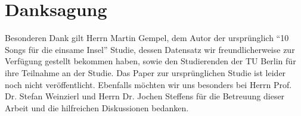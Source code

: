 \section*{Danksagung}
\label{sec:Danksagung}
Besonderen Dank gilt Herrn Martin Gempel, dem Autor der ursprünglich "`10 Songs für die einsame Insel"' Studie, dessen Datensatz wir freundlicherweise zur Verfügung gestellt bekommen haben, sowie den Studierenden der TU Berlin für ihre Teilnahme an der Studie.
Das Paper zur ursprünglichen Studie ist leider noch nicht veröffentlicht.
Ebenfalls möchten wir uns besonders  bei Herrn Prof. Dr. Stefan Weinzierl und Herrn Dr. Jochen Steffens für die Betreuung dieser Arbeit und die hilfreichen Diskussionen bedanken.
